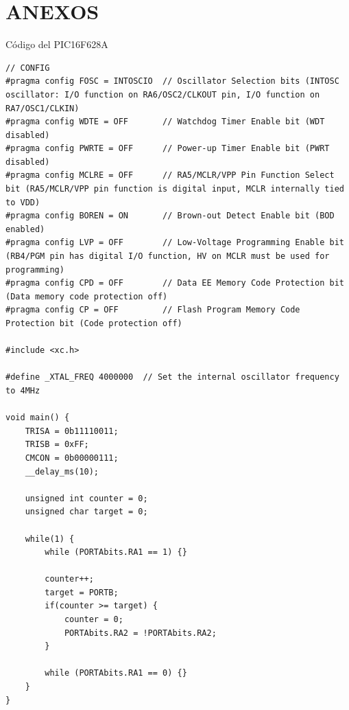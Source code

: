 \section{ANEXOS} 
Código del PIC16F628A

\begin{verbatim}
// CONFIG
#pragma config FOSC = INTOSCIO  // Oscillator Selection bits (INTOSC oscillator: I/O function on RA6/OSC2/CLKOUT pin, I/O function on RA7/OSC1/CLKIN)
#pragma config WDTE = OFF       // Watchdog Timer Enable bit (WDT disabled)
#pragma config PWRTE = OFF      // Power-up Timer Enable bit (PWRT disabled)
#pragma config MCLRE = OFF      // RA5/MCLR/VPP Pin Function Select bit (RA5/MCLR/VPP pin function is digital input, MCLR internally tied to VDD)
#pragma config BOREN = ON       // Brown-out Detect Enable bit (BOD enabled)
#pragma config LVP = OFF        // Low-Voltage Programming Enable bit (RB4/PGM pin has digital I/O function, HV on MCLR must be used for programming)
#pragma config CPD = OFF        // Data EE Memory Code Protection bit (Data memory code protection off)
#pragma config CP = OFF         // Flash Program Memory Code Protection bit (Code protection off)

#include <xc.h>

#define _XTAL_FREQ 4000000  // Set the internal oscillator frequency to 4MHz

void main() {
    TRISA = 0b11110011;
    TRISB = 0xFF;
    CMCON = 0b00000111;
    __delay_ms(10);
    
    unsigned int counter = 0;
    unsigned char target = 0;

    while(1) {
        while (PORTAbits.RA1 == 1) {}
        
        counter++;
        target = PORTB;
        if(counter >= target) {
            counter = 0;
            PORTAbits.RA2 = !PORTAbits.RA2;
        }
        
        while (PORTAbits.RA1 == 0) {}
    }
}
\end{verbatim}

